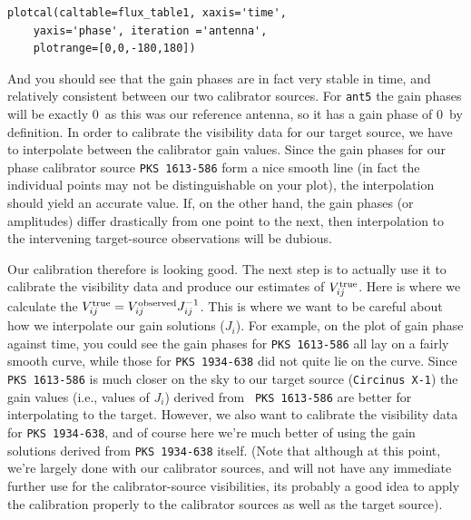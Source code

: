 \documentclass[force,almostfull,justified]{tufte-book}
\begin{document}
\begin{casacmd}
\begin{verbatim}
plotcal(caltable=flux_table1, xaxis='time',
    yaxis='phase', iteration ='antenna',
    plotrange=[0,0,-180,180])
\end{verbatim}
\end{casacmd}

And you should see that the gain phases are in fact very stable in time, and relatively consistent
between our two calibrator sources.  For {\tt ant5} the gain phases will be exactly 0\arcdeg\ as this
was our reference antenna, so it has a gain phase of 0\arcdeg\ by definition.  In order to calibrate
the visibility data for our target source, we have to interpolate between the calibrator gain values.
Since the gain phases for our phase calibrator source {\tt PKS 1613-586} form a nice smooth line (in
fact the individual points may not be distinguishable on your plot), the interpolation should yield an
accurate value. If, on the other hand, the gain phases (or amplitudes) differ drastically from one
point to the next, then interpolation to the intervening target-source observations will be dubious.

Our calibration therefore is looking good.  The next step is to actually use it to calibrate the
visibility data and produce our estimates of $V_{ij}^{\rm true}$.  Here is where we calculate the
$V_{ij}^{\rm true} = V_{ij}^{\rm observed} J_{ij}^{-1}$.  This is where we want to be careful about
how we interpolate our gain solutions ($J_i$).  For example, on the plot of gain phase against time,
you could see the gain phases for {\tt PKS 1613-586} all lay on a fairly smooth curve, while those for
{\tt PKS 1934-638} did not quite lie on the curve.  Since {\tt PKS 1613-586} is much closer on the sky
to our target source ({\tt Circinus X-1}) the gain values (i.e., values of $J_i$) derived from {\tt
PKS 1613-586} are better for interpolating to the target.  However, we also want to calibrate the
visibility data for {\tt PKS 1934-638}, and of course here we're much better of using the gain
solutions derived from {\tt PKS 1934-638} itself.  (Note that although at this point, we're largely
done with our calibrator sources, and will not have any immediate further use for the
calibrator-source visibilities, its probably a good idea to apply the calibration properly to the
calibrator sources as well as the target source).
\end{document}
